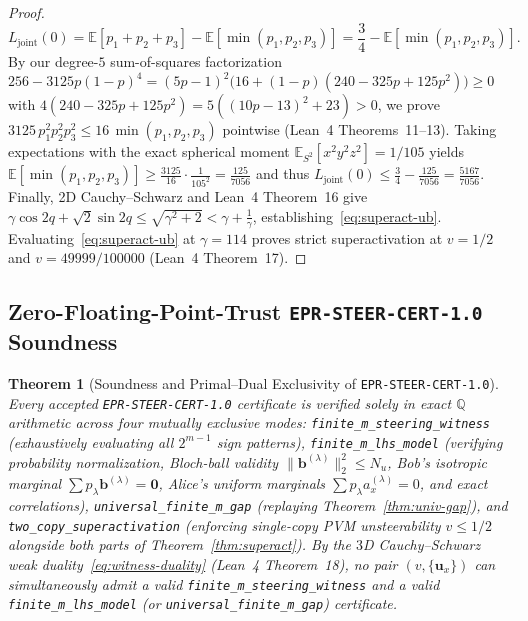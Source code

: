 \documentclass[11pt,a4paper]{article}
\newtheorem{theorem}{Theorem}[section]
\theoremstyle{definition}
\theoremstyle{remark}
\newcommand{\QQ}{\mathbb{Q}}
\newcommand{\certschema}{\texttt{EPR-STEER-CERT-1.0}}
\begin{document}
\begin{proof}
\[
  L_{\mathrm{joint}}(0) = \mathbb{E}[p_1+p_2+p_3] - \mathbb{E}[\min(p_1,p_2,p_3)] = \frac{3}{4} - \mathbb{E}[\min(p_1,p_2,p_3)].
\]
By our degree-$5$ sum-of-squares factorization $256 - 3125 p(1-p)^4 = (5p-1)^2\bigl(16 + (1-p)(240 - 325p + 125p^2)\bigr) \ge 0$ with $4(240 - 325p + 125p^2) = 5((10p-13)^2 + 23) > 0$, we prove $3125\,p_1^2 p_2^2 p_3^2 \le 16\,\min(p_1,p_2,p_3)$ pointwise (Lean~4 Theorems~11--13). Taking expectations with the exact spherical moment $\mathbb{E}_{S^2}[x^2 y^2 z^2] = 1/105$ yields $\mathbb{E}[\min(p_1,p_2,p_3)] \ge \frac{3125}{16}\cdot\frac{1}{105^2} = \frac{125}{7056}$ and thus $L_{\mathrm{joint}}(0) \le \frac{3}{4} - \frac{125}{7056} = \frac{5167}{7056}$. Finally, 2D Cauchy--Schwarz and Lean~4 Theorem~16 give $\gamma\cos 2q + \sqrt{2}\sin 2q \le \sqrt{\gamma^2 + 2} < \gamma + \frac{1}{\gamma}$, establishing~\eqref{eq:superact-ub}. Evaluating~\eqref{eq:superact-ub} at $\gamma = 114$ proves strict superactivation at $v = 1/2$ and $v = 49999/100000$ (Lean~4 Theorem~17).
\end{proof}

\subsection{Zero-Floating-Point-Trust \texorpdfstring{\certschema{}}{EPR-STEER-CERT-1.0} Soundness}

\begin{theorem}[Soundness and Primal--Dual Exclusivity of \certschema{}]\label{thm:cert}
Every accepted \certschema{} certificate is verified solely in exact $\QQ$ arithmetic across four mutually exclusive modes: \texttt{finite\_m\_steering\_witness} (exhaustively evaluating all $2^{m-1}$ sign patterns), \texttt{finite\_m\_lhs\_model} (verifying probability normalization, Bloch-ball validity $\|\mathbf{b}^{(\lambda)}\|_2^2 \le N_u$, Bob's isotropic marginal $\sum p_\lambda \mathbf{b}^{(\lambda)} = \mathbf{0}$, Alice's uniform marginals $\sum p_\lambda a_x^{(\lambda)} = 0$, and exact correlations), \texttt{universal\_finite\_m\_gap} (replaying Theorem~\ref{thm:univ-gap}), and \texttt{two\_copy\_superactivation} (enforcing single-copy PVM unsteerability $v \le 1/2$ alongside both parts of Theorem~\ref{thm:superact}). By the $3$D Cauchy--Schwarz weak duality~\eqref{eq:witness-duality} (Lean~4 Theorem~18), no pair $(v, \{\mathbf{u}_x\})$ can simultaneously admit a valid \texttt{finite\_m\_steering\_witness} and a valid \texttt{finite\_m\_lhs\_model} (or \texttt{universal\_finite\_m\_gap}) certificate.
\end{theorem}
\end{document}
